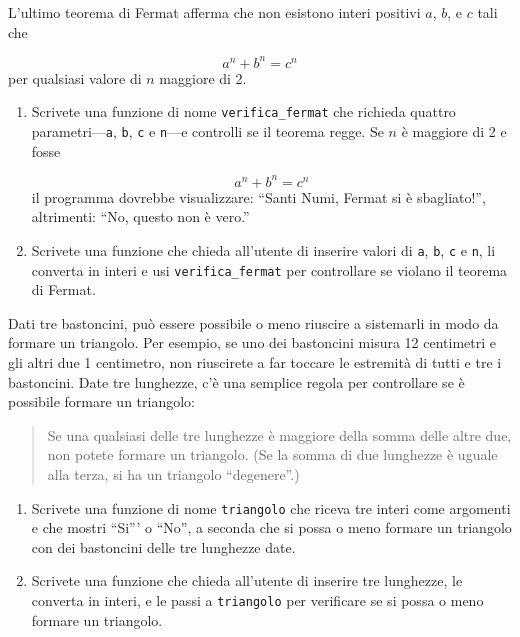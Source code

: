 \documentclass[10pt]{book}
\begin{document}
\vspace{0.2in}
\begin{exercise}

L'ultimo teorema di Fermat afferma che non esistono interi positivi
$a$, $b$, e $c$ tali che

\[ a^n + b^n = c^n \]
%
per qualsiasi valore di $n$ maggiore di 2.

\begin{enumerate}

\item Scrivete una funzione di nome \verb"verifica_fermat" che richieda quattro parametri---{\tt a}, {\tt b}, {\tt c} e {\tt n}---e controlli se il teorema regge. Se $n$ è maggiore di 2 e fosse

\[a^n + b^n = c^n \]
%
il programma dovrebbe visualizzare: ``Santi Numi, Fermat si è sbagliato!'',
altrimenti: ``No, questo non è vero.''

\item Scrivete una funzione che chieda all'utente di inserire valori di {\tt a}, {\tt b}, {\tt c} e {\tt n}, li converta in interi e usi \verb"verifica_fermat" per controllare se violano il teorema di Fermat.

\end{enumerate}

\end{exercise}

\vspace{0.2in}
\begin{exercise}

Dati tre bastoncini, può essere possibile o meno riuscire a sistemarli in modo da formare un triangolo. Per esempio, se uno dei bastoncini misura 12 centimetri e gli altri due 1 centimetro, non riuscirete a far toccare le estremità di tutti e tre i bastoncini. Date tre lunghezze, c'è una semplice regola per controllare se è possibile formare un triangolo:

\begin{quotation}
Se una qualsiasi delle tre lunghezze è maggiore della somma delle altre due, non potete formare un triangolo. (Se la somma di due lunghezze è uguale alla terza, si ha un triangolo ``degenere''.)
\end{quotation}

\begin{enumerate}

\item Scrivete una funzione di nome \verb"triangolo" che riceva tre interi come argomenti e che mostri ``Si''' o ``No'', a seconda che si possa o meno formare un triangolo con dei bastoncini delle tre lunghezze date.

\item Scrivete una funzione che chieda all'utente di inserire tre lunghezze, le converta in interi, e le passi a \verb"triangolo" per verificare se si possa o meno formare un triangolo.

\end{enumerate}

\end{exercise}
\end{document}
